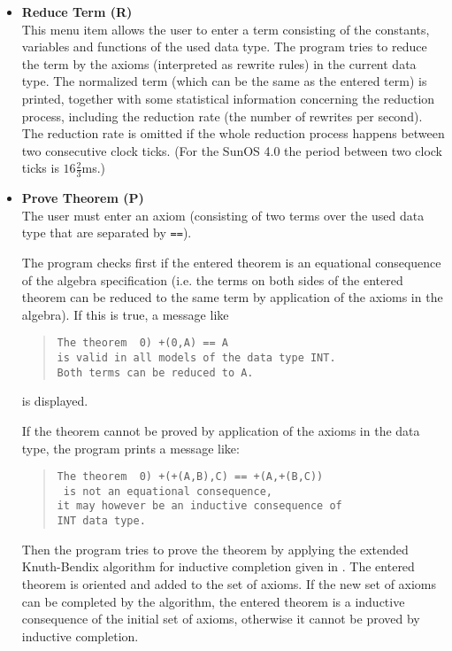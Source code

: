 \begin{itemize}
\item {\bf Reduce Term (R)}\\
This menu item allows the user to enter a term consisting of the
constants, variables and functions of the used data type.
The program tries to reduce the term by the axioms (interpreted as
rewrite rules) in the current data
type. The normalized term (which can be the same as the entered term) 
is printed,
together with some statistical information concerning the reduction process,
including the reduction rate (the number of rewrites per second).
The reduction rate is omitted if 
the whole reduction process happens between two consecutive clock ticks.
(For the SunOS 4.0 the period between two clock ticks is $16\frac{2}{3}$ms.)

\item {\bf Prove Theorem (P)}\\
The user must enter an axiom (consisting of two terms over the used data
type that are separated by {\tt ==}).

The program checks first if the entered theorem is an equational 
consequence of the algebra specification (i.e. the terms on both sides of
the entered theorem can be reduced to the same term by application of the 
axioms in the algebra). If this is true, a message like
\begin{quote}
\begin{verbatim}
The theorem  0) +(0,A) == A
is valid in all models of the data type INT.
Both terms can be reduced to A.
\end{verbatim}
\end{quote}
is displayed.

If the theorem cannot be proved by application of the axioms in the data type,
the program prints a message like:
\begin{quote}
\begin{verbatim}
The theorem  0) +(+(A,B),C) == +(A,+(B,C))
 is not an equational consequence, 
it may however be an inductive consequence of
INT data type.
\end{verbatim}
\end{quote}
Then the program tries to prove the theorem by applying the extended 
Knuth-Bendix algorithm for inductive completion given in \cite{Kuechlin:89}.
The entered 
theorem is oriented and added to the set of axioms. If the new set of
axioms  can 
be completed by the algorithm, the entered theorem is a inductive consequence
of the initial set of axioms, otherwise it cannot be proved by inductive
completion.


\end{itemize}
